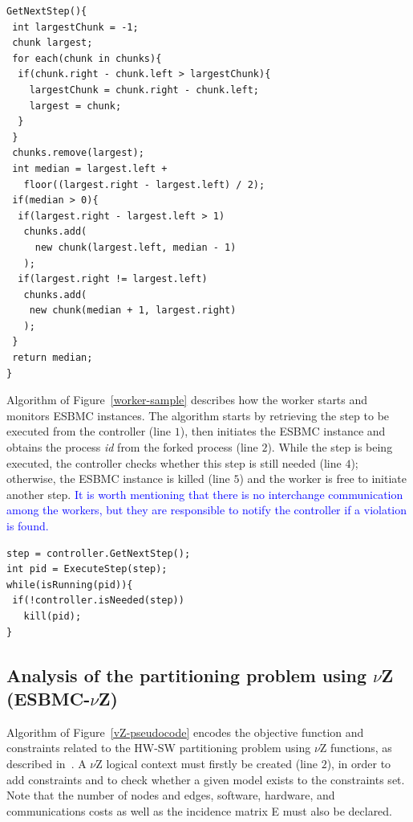 \documentclass{doublecol-new}
\theoremstyle{TH}{
\newtheorem{lemma}{Lemma}
\newtheorem{theorem}[lemma]{Theorem}
\newtheorem{corrolary}[lemma]{Corrolary}
\newtheorem{conjecture}[lemma]{Conjecture}
\newtheorem{proposition}[lemma]{Proposition}
\newtheorem{claim}[lemma]{Claim}
\newtheorem{stheorem}[lemma]{Wrong Theorem}
\newtheorem{algorithm}{Algorithm}
}
\theoremstyle{THrm}{
\newtheorem{definition}{Definition}[section]
\newtheorem{question}{Question}[section]
\newtheorem{remark}{Remark}
\newtheorem{scheme}{Scheme}
}
\theoremstyle{THhit}{
\newtheorem{case}{Case}[section]
}
\begin{document}
\begin{lstlisting}[basicstyle=\footnotesize,caption={Steps calculation using intervals.},label={Steps-Calculation-using-Intervals},numbersep=7pt,frame=tb,captionpos=t,numberstyle=\tiny]
GetNextStep(){
 int largestChunk = -1;
 chunk largest;
 for each(chunk in chunks){
  if(chunk.right - chunk.left > largestChunk){
    largestChunk = chunk.right - chunk.left;
    largest = chunk;
  }
 }	
 chunks.remove(largest);	
 int median = largest.left + 
   floor((largest.right - largest.left) / 2);
 if(median > 0){
  if(largest.right - largest.left > 1)
   chunks.add(
     new chunk(largest.left, median - 1)
   );	
  if(largest.right != largest.left)
   chunks.add(
    new chunk(median + 1, largest.right)
   );
 }
 return median;
}
\end{lstlisting}

Algorithm of Figure~\ref{worker-sample} describes how the worker starts and monitors ESBMC instances. The algorithm starts by retrieving the step to be executed from the controller (line $1$), then initiates the ESBMC instance and obtains the process \textit{id} from the forked process (line $2$). While the step is being executed, the controller checks whether this step is still needed (line $4$); otherwise, the ESBMC instance is killed (line $5$) and the worker is free to initiate another step.  \textcolor{blue}{It is worth mentioning that there is no interchange communication among the workers, but they are responsible to notify the controller if a violation is found.}


\begin{lstlisting}[basicstyle=\footnotesize,caption={Worker sample.},label={worker-sample},numbersep=7pt,frame=tb,captionpos=t,numberstyle=\tiny]
step = controller.GetNextStep();
int pid = ExecuteStep(step);
while(isRunning(pid)){
 if(!controller.isNeeded(step))
   kill(pid);
}
\end{lstlisting}

\subsection{Analysis of the partitioning problem using $\nu$Z (ESBMC-$\nu$Z)}
\label{Analysis-of-the-partitioning-problem-using-vZ}

Algorithm of Figure~\ref{vZ-pseudocode} encodes the objective function and constraints related to the HW-SW partitioning problem using $\nu$Z functions, as described in~\cite{Bjorner2014}. A $\nu$Z logical context must firstly be created (line $2$), in order to add constraints and to check whether a given model exists to the constraints set. Note that the number of nodes and edges, software, hardware, and communications costs as well as the incidence matrix E must also be declared.
\end{document}
